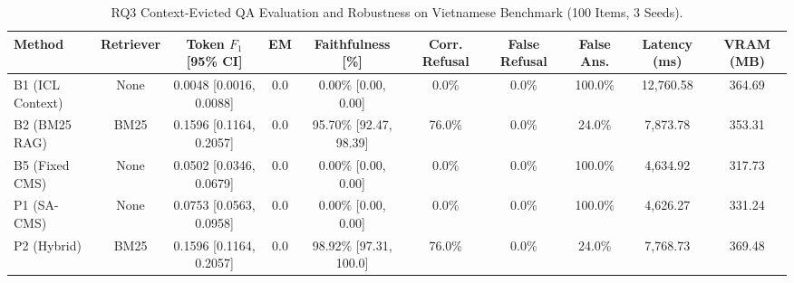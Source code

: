 \begin{table}[t]
\centering
\small
\caption{RQ3 Context-Evicted QA Evaluation and Robustness on Vietnamese Benchmark (100 Items, 3 Seeds).}
\label{tab:rq3_context_evicted}
\begin{tabular}{lccccccccc}
\toprule
\textbf{Method} & \textbf{Retriever} & \textbf{Token $F_1$ [95\% CI]} & \textbf{EM} & \textbf{Faithfulness [\%]} & \textbf{Corr. Refusal} & \textbf{False Refusal} & \textbf{False Ans.} & \textbf{Latency (ms)} & \textbf{VRAM (MB)} \\
\midrule
B1 (ICL Context) & None  & 0.0048 [0.0016, 0.0088] & 0.0 & 0.00\% [0.00, 0.00]   & 0.0\%  & 0.0\% & 100.0\% & 12,760.58 & 364.69 \\
B2 (BM25 RAG)    & BM25  & 0.1596 [0.1164, 0.2057] & 0.0 & 95.70\% [92.47, 98.39] & 76.0\% & 0.0\% & 24.0\%  & 7,873.78  & 353.31 \\
B5 (Fixed CMS)   & None  & 0.0502 [0.0346, 0.0679] & 0.0 & 0.00\% [0.00, 0.00]   & 0.0\%  & 0.0\% & 100.0\% & 4,634.92  & 317.73 \\
P1 (SA-CMS)      & None  & 0.0753 [0.0563, 0.0958] & 0.0 & 0.00\% [0.00, 0.00]   & 0.0\%  & 0.0\% & 100.0\% & 4,626.27  & 331.24 \\
P2 (Hybrid)      & BM25  & 0.1596 [0.1164, 0.2057] & 0.0 & 98.92\% [97.31, 100.0] & 76.0\% & 0.0\% & 24.0\%  & 7,768.73  & 369.48 \\
\bottomrule
\end{tabular}
\end{table}
